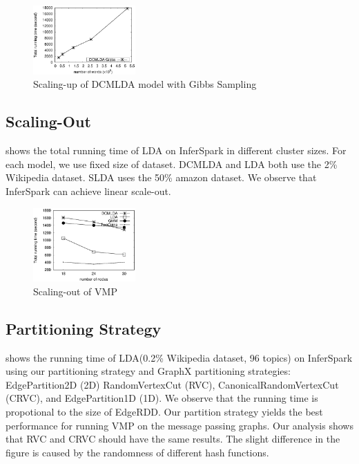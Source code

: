 \begin{figure}[h]\centering
	\includegraphics[width=0.35\textwidth]{figs/exp_dcmlda_gibbs.eps}
	\caption{Scaling-up of DCMLDA model with Gibbs Sampling}
	\label{fig:scale-up-gibbs}
\end{figure}

\subsection{Scaling-Out}

 shows the total running time of LDA on InferSpark in
different cluster sizes. For each model, we use fixed size of dataset.  DCMLDA
and LDA both use the 2\% Wikipedia dataset. SLDA uses the 50\% amazon dataset.
We observe that InferSpark can achieve linear scale-out.

\begin{figure}[h]
	\centering
	\includegraphics[width=0.35\textwidth]{figs/exp_clustersize_vmp.eps}
	\caption{Scaling-out of VMP}
	\label{fig:scale-out}
\end{figure}


\subsection{Partitioning Strategy}

 shows the running time of LDA(0.2\% Wikipedia dataset, 96 topics) on InferSpark
using our partitioning strategy  and
GraphX partitioning strategies:
EdgePartition2D  (2D)
RandomVertexCut (RVC),
CanonicalRandomVertexCut (CRVC), and
EdgePartition1D (1D).
We observe that the running time is propotional to the size of EdgeRDD.
Our partition strategy yields the best performance for running VMP on the
message passing graphs.  Our analysis shows that RVC and CRVC should have the
same results. The slight difference in the figure is caused by the randomness
of different hash functions.


